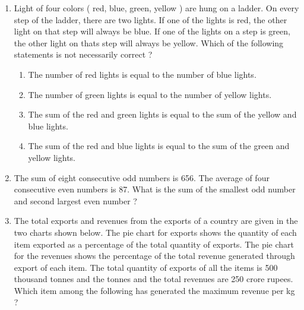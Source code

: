 \documentclass[journal]{IEEEtran}
\begin{document}
\begin{enumerate}
\begin{enumerate}
		\end{enumerate}
	\item Light of four colors ( red, blue, green, yellow ) are hung on a ladder. On every step of the ladder, there are two lights. If one of the lights is red, the other light on that step will always be blue. If one of the lights on a step is green, the other light on thats step will always be yellow. Which of the following statements is not necessarily correct ?
		\begin{enumerate}
			\item The number of red lights is equal to the number of blue lights.
			\item The number of green lights is equal to the number of yellow lights.
			\item The sum of the red and green lights is equal to the sum of the yellow and blue lights.
			\item The sum of the red and blue lights is equal to the sum of the green and yellow lights.
		\end{enumerate}
	\item The sum of eight consecutive odd numbers is 656. The average of four consecutive even numbers is 87. What is the sum of the smallest odd number and second largest even number ?
	\item The total exports and revenues from the exports of a country are given in the two charts shown below. The pie chart for exports shows the quantity of each item exported as a percentage of the total quantity of exports. The pie chart for the revenues shows the percentage of the total revenue generated through export of each item. The total quantity of exports of all the items is 500 thousand tonnes and the tonnes and the total revenues are 250 crore rupees. Which item among the following has generated the maximum revenue per kg ?
		\begin{figure}
			\centering
			
			\caption{}
			\label{25}
		\end{figure}
		\begin{figure}
			\centering
			
			\caption{}
			\label{25}
		\end{figure}

\end{enumerate}
\end{document}
